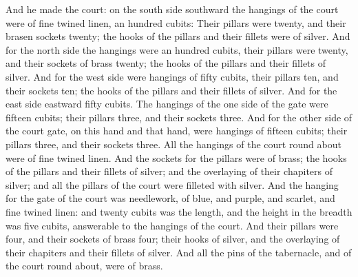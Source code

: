  And he made the court: on the south side southward the
hangings of the court were of fine twined linen, an hundred cubits:
 Their pillars were twenty, and their brasen sockets
twenty; the hooks of the pillars and their fillets were of silver.
 And for the north side the hangings were an hundred
cubits, their pillars were twenty, and their sockets of brass twenty;
the hooks of the pillars and their fillets of silver.  And
for the west side were hangings of fifty cubits, their pillars ten, and
their sockets ten; the hooks of the pillars and their fillets of silver.
 And for the east side eastward fifty cubits. 
The hangings of the one side of the gate were fifteen cubits; their
pillars three, and their sockets three.  And for the other
side of the court gate, on this hand and that hand, were hangings of
fifteen cubits; their pillars three, and their sockets three.
 All the hangings of the court round about were of fine
twined linen.  And the sockets for the pillars were of
brass; the hooks of the pillars and their fillets of silver; and the
overlaying of their chapiters of silver; and all the pillars of the
court were filleted with silver.  And the hanging for the
gate of the court was needlework, of blue, and purple, and scarlet, and
fine twined linen: and twenty cubits was the length, and the height in
the breadth was five cubits, answerable to the hangings of the court.
 And their pillars were four, and their sockets of brass
four; their hooks of silver, and the overlaying of their chapiters and
their fillets of silver.  And all the pins of the
tabernacle, and of the court round about, were of brass.

